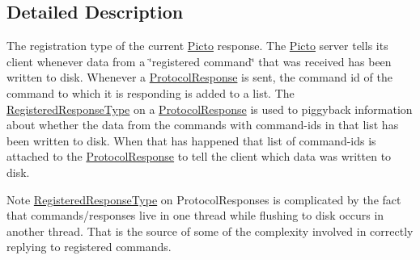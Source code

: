 \subsection{Detailed Description}
The registration type of the current \hyperlink{namespace_picto}{Picto} response. The \hyperlink{namespace_picto}{Picto} server tells its client whenever data from a \char`\"{}registered command\char`\"{} that was received has been written to disk. Whenever a \hyperlink{struct_picto_1_1_protocol_response}{Protocol\-Response} is sent, the command id of the command to which it is responding is added to a list. The \hyperlink{namespace_picto_1_1_registered_response_type}{Registered\-Response\-Type} on a \hyperlink{struct_picto_1_1_protocol_response}{Protocol\-Response} is used to piggyback information about whether the data from the commands with command-\/ids in that list has been written to disk. When that has happened that list of command-\/ids is attached to the \hyperlink{struct_picto_1_1_protocol_response}{Protocol\-Response} to tell the client which data was written to disk. \begin{DoxyNote}{Note}
\hyperlink{namespace_picto_1_1_registered_response_type}{Registered\-Response\-Type} on Protocol\-Responses is complicated by the fact that commands/responses live in one thread while flushing to disk occurs in another thread. That is the source of some of the complexity involved in correctly replying to registered commands. 
\end{DoxyNote}



